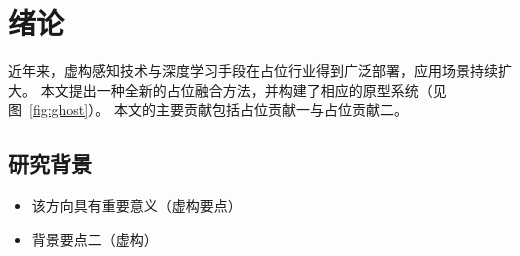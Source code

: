 \chapter{绪论}
近年来，虚构感知技术与深度学习手段在占位行业得到广泛部署，应用场景持续扩大。
本文提出一种全新的占位融合方法，并构建了相应的原型系统（见图~\ref{fig:ghost}）。
本文的主要贡献包括占位贡献一与占位贡献二。

\section{研究背景}
\begin{itemize}
\item 该方向具有重要意义（虚构要点）
\item 背景要点二（虚构）
\end{itemize}
